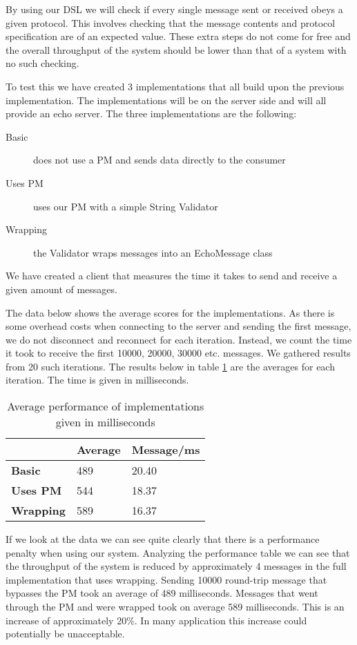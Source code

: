 By using our DSL we will check if every single message sent or received obeys a given protocol. This involves checking that the message contents and protocol specification are of an expected value. These extra steps do not come for free and the overall throughput of the system should be lower than that of a system with no such checking. 

To test this we have created 3 implementations that all build upon the previous implementation. The implementations will be on the server side and will all provide an echo server. The three implementations are the following:

\begin{description}
  \item[Basic] does not use a PM and sends data directly to the consumer
  \item[Uses PM] uses our PM with a simple String Validator
  \item[Wrapping] the Validator wraps messages into an EchoMessage class
\end{description}
We have created a client that measures the time it takes to send and receive a given amount of messages.

The data below shows the average scores for the implementations. As there is some overhead costs when connecting to the server and sending the first message, we do not disconnect and reconnect for each iteration. Instead, we count the time it took to receive the first 10000, 20000, 30000 etc. messages. We gathered results from 20 such iterations. The results below in table \ref{tab:performance} are the averages for each iteration. The time is given in milliseconds. 

\begin{table}[h]
	\centering
	\begin{tabular}{|l|l|l|}
		\hline
		{\bf }         & {\bf Average} & {\bf Message/ms} \\ \hline
		{\bf Basic}    & 489           & 20.40              \\ \hline
		{\bf Uses PM}  & 544           & 18.37              \\ \hline
		{\bf Wrapping} & 589           & 16.37              \\ \hline
	\end{tabular}
	\label{tab:performance}
	\caption{Average performance of implementations given in milliseconds}
\end{table}
If we look at the data we can see quite clearly that there is a performance penalty when using our system. Analyzing the performance table we can see that the throughput of the system is reduced by approximately 4 messages in the full implementation that uses wrapping. Sending 10000 round-trip message that bypasses the PM took an average of 489 milliseconds. Messages that went through the PM and were wrapped took on average 589 milliseconds. This is an increase of approximately 20\%. In many application this increase could potentially be unacceptable.

